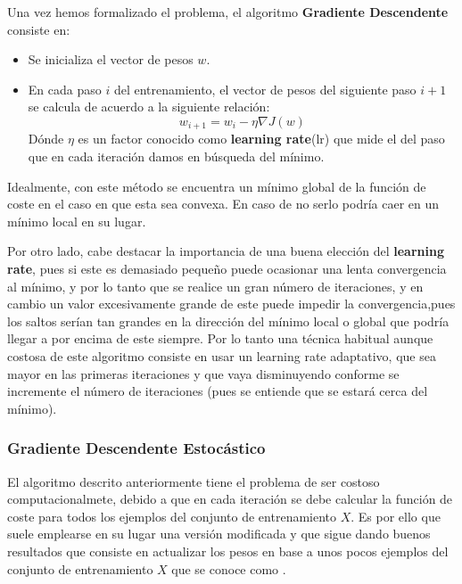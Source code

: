         \noindent Una vez hemos formalizado el problema, el algoritmo \textbf{Gradiente Descendente} consiste en: 

        \begin{itemize}
            \item Se inicializa el vector de pesos $w$.
            \item En cada paso $i$ del entrenamiento, el vector de pesos del siguiente paso $i+1$ se calcula de acuerdo a la siguiente relación: 
            \begin{equation}
                w_{i+1}=w_i-\eta \nabla J(w)
            \end{equation}
            \noindent Dónde $\eta$ es un factor conocido como \textbf{learning rate}(lr) que mide el  del paso que en cada iteración damos en búsqueda del mínimo. 
        \end{itemize}

        \noindent Idealmente, con este método se encuentra un mínimo global de la función de coste en el caso en que esta sea convexa. En caso de no serlo podría caer en un mínimo local en su lugar. 

        \medskip

        \noindent Por otro lado, cabe destacar la importancia de una buena elección del \textbf{learning rate}, pues si este es demasiado pequeño puede ocasionar una lenta convergencia al mínimo, y por lo tanto que se realice un gran número de iteraciones, y en cambio un valor excesivamente grande de este puede impedir la convergencia,pues los saltos serían tan grandes en la dirección del mínimo local o global que podría llegar a  por encima de este siempre. Por lo tanto una técnica habitual aunque costosa de este algoritmo consiste en usar un learning rate adaptativo, que sea mayor en las primeras iteraciones y que vaya disminuyendo conforme se incremente el número de iteraciones (pues se entiende que se estará cerca del mínimo).

        \subsubsection{Gradiente Descendente Estocástico}

            \noindent El algoritmo descrito anteriormente tiene el problema de ser costoso computacionalmete, debido a que en cada iteración se debe calcular la función de coste para todos los ejemplos del conjunto de entrenamiento $X$. Es por ello que suele emplearse en su lugar una versión modificada y que sigue dando buenos resultados que consiste en actualizar los pesos en base a unos pocos ejemplos del conjunto de entrenamiento $X$ que se conoce como .




